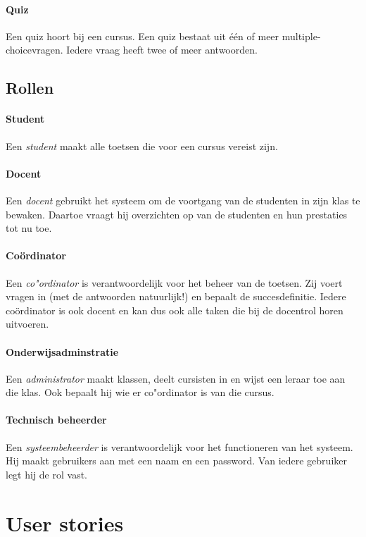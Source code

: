 \documentclass[11pt, a4paper]{article}
\begin{document}
\paragraph{Quiz}
Een quiz hoort bij een cursus.
Een quiz bestaat uit \'e\'en of meer multiple-choicevragen.
Iedere vraag heeft twee of meer antwoorden.

\subsection{Rollen}

\paragraph{Student} Een \emph{student} maakt alle toetsen die voor een cursus vereist zijn.

\paragraph{Docent} Een \emph{docent} gebruikt het systeem om de voortgang van de studenten in zijn klas te bewaken.
Daartoe vraagt hij overzichten op van de studenten en hun prestaties tot nu toe.

\paragraph{Co\"ordinator} Een \emph{co"ordinator} is verantwoordelijk voor het beheer van de toetsen.
Zij voert vragen in (met de antwoorden natuurlijk!) en bepaalt de succesdefinitie. Iedere co\"ordinator is ook docent en kan dus ook alle taken die bij de docentrol horen uitvoeren.

\paragraph{Onderwijsadminstratie} Een \emph{administrator} maakt klassen, deelt cursisten in en wijst een leraar toe aan die klas.
Ook bepaalt hij wie er co"ordinator is van die cursus.

\paragraph{Technisch beheerder} Een \emph{systeembeheerder} is verantwoordelijk voor het functioneren van het systeem.
Hij maakt gebruikers aan met een naam en een password.
Van iedere gebruiker legt hij de rol vast.

\section{User stories}
\end{document}
